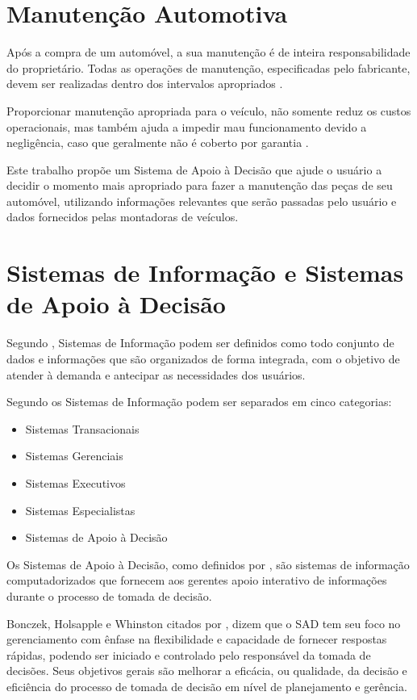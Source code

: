 \documentclass[12pt]{article}
\begin{document}
\section{Manutenção Automotiva} \label{sec:manutencao}
Após a compra de um automóvel, a sua manutenção é de inteira responsabilidade
do proprietário. Todas as operações de manutenção, especificadas pelo fabricante,
devem ser realizadas dentro dos intervalos apropriados \cite{manualhyundai}.

Proporcionar manutenção apropriada para o veículo, não somente reduz os custos
operacionais, mas também ajuda a impedir mau funcionamento devido a negligência,
caso que geralmente não é coberto por garantia \cite{manualonix}.

Este trabalho propõe um Sistema de Apoio à Decisão que ajude o usuário a
decidir o momento mais apropriado para fazer a manutenção das peças de seu
automóvel, utilizando informações relevantes que serão passadas pelo usuário e
dados fornecidos pelas montadoras de veículos.

\section{Sistemas de Informação e Sistemas de Apoio à Decisão} \label{sec:sisad}
Segundo , Sistemas de Informação podem ser
definidos como todo conjunto de dados e informações que são organizados de forma
integrada, com o objetivo de atender à demanda e antecipar as necessidades dos
usuários.

Segundo  os Sistemas de Informação podem ser
separados em cinco categorias:

\begin{itemize}
    \item Sistemas Transacionais
    \item Sistemas Gerenciais
    \item Sistemas Executivos
    \item Sistemas Especialistas
    \item Sistemas de Apoio à Decisão
\end{itemize}

Os Sistemas de Apoio à Decisão, como definidos por ,
são sistemas de informação computadorizados que fornecem aos gerentes apoio
interativo de informações durante o processo de tomada de decisão.

Bonczek, Holsapple e Whinston citados por , dizem que
o SAD tem seu foco no gerenciamento com ênfase na flexibilidade e capacidade de
fornecer respostas rápidas, podendo ser iniciado e controlado pelo responsável
da tomada de decisões. Seus objetivos gerais são melhorar a eficácia, ou
qualidade, da decisão e eficiência do processo de tomada de decisão em nível de
planejamento e gerência.
\end{document}
